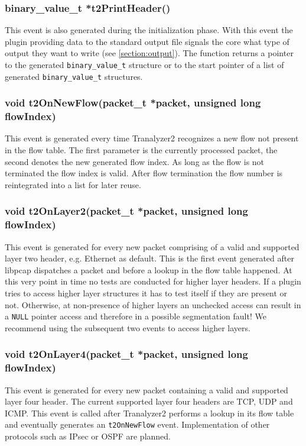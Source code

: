 \documentclass[documentation]{subfiles}
\begin{document}
\subsubsection{binary\_value\_t *t2PrintHeader()}
This event is also generated during the initialization phase. With this event the plugin providing data to the standard output file signals the core what type of output they want to write (see \ref{section:output}). The function returns a pointer to the generated {\tt binary\_value\_t} structure or to the start pointer of a list of generated {\tt binary\_value\_t} structures.

\subsubsection{void t2OnNewFlow(packet\_t *packet, unsigned long flowIndex)}
This event is generated every time Tranalyzer2 recognizes a new flow not present in the flow table. The first parameter is the currently processed packet, the second denotes the new generated flow index. As long as the flow is not terminated the flow index is valid. After flow termination the flow number is reintegrated into a list for later reuse.

\subsubsection{void t2OnLayer2(packet\_t *packet, unsigned long flowIndex)}
This event is generated for every new packet comprising of a valid and supported layer two header, e.g. Ethernet as default. This is the first event generated after libpcap dispatches a packet and before a lookup in the flow table happened. At this very point in time no tests are conducted for higher layer headers. If a plugin tries to access higher layer structures it has to test itself if they are present or not. Otherwise, at non-presence of higher layers an unchecked access can result in a {\tt NULL} pointer access and therefore in a possible segmentation fault! We recommend using the subsequent two events to access higher layers.

\subsubsection{void t2OnLayer4(packet\_t *packet, unsigned long flowIndex)}
This event is generated for every new packet containing a valid and supported layer four header. The current supported layer four headers are TCP, UDP and ICMP. This event is called after Tranalyzer2 performs a lookup in its flow table and eventually generates an {\tt t2OnNewFlow} event. Implementation of other protocols such as IPsec or OSPF are planned.
\end{document}
